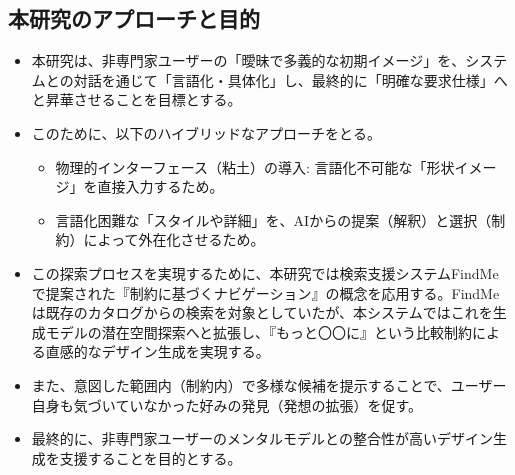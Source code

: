 \documentclass[dvipdfmx]{jlreq}
\begin{document}
\subsection{本研究のアプローチと目的}
\begin{itemize}
  \item 本研究は、非専門家ユーザーの「曖昧で多義的な初期イメージ」を、システムとの対話を通じて「言語化・具体化」し、最終的に「明確な要求仕様」へと昇華させることを目標とする。
  \item このために、以下のハイブリッドなアプローチをとる。
  \begin{itemize}
    \item 物理的インターフェース（粘土）の導入: 言語化不可能な「形状イメージ」を直接入力するため。
    \item 言語化困難な「スタイルや詳細」を、AIからの提案（解釈）と選択（制約）によって外在化させるため。
  \end{itemize}
  \item この探索プロセスを実現するために、本研究では検索支援システムFindMeで提案された『制約に基づくナビゲーション』の概念を応用する。FindMeは既存のカタログからの検索を対象としていたが、本システムではこれを生成モデルの潜在空間探索へと拡張し、『もっと〇〇に』という比較制約による直感的なデザイン生成を実現する。
  \item また、意図した範囲内（制約内）で多様な候補を提示することで、ユーザー自身も気づいていなかった好みの発見（発想の拡張）を促す。
  \item 最終的に、非専門家ユーザーのメンタルモデルとの整合性が高いデザイン生成を支援することを目的とする。

\end{itemize}
\end{document}
